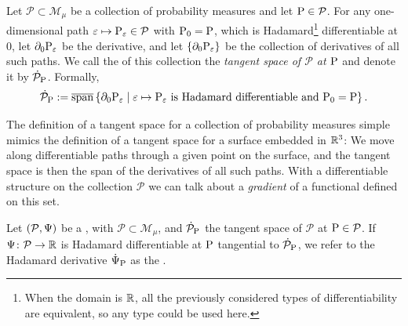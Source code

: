 \documentclass[a4,danish]{article}
\begin{document}
\begin{definition}
  Let $\mathcal{P} \subset \mathcal{M}_{\mu}$ be a collection of probability measures and let
  $\P \in \mathcal{P}$. For any one-dimensional path
  $\epsilon \mapsto \P_{\epsilon} \in \mathcal{P}$ with $\P_0 =\P$, which is Hadamard\footnote{When
    the domain is $\R$, all the previously considered types of differentiability are equivalent, so
    any type could be used here.} differentiable at 0, let $\partial_0\P_{\epsilon}$ be the
  derivative, and let $\{\partial_0\P_{\epsilon}\}$ be the collection of derivatives of all such paths. We call
  the  of this collection the \textit{tangent space of
    $\mathcal{P}$ at $\P$} and denote it by $\dot{\mathcal{P}}_{\P}$. Formally,
  \begin{equation*}
    \dot{\mathcal{P}}_{\P}
    := \overline{\mathrm{span}}
    \left\{ \partial_0\P_{\epsilon}
      \midd \epsilon \mapsto \P_{\epsilon} \text{ is Hadamard differentiable and } \P_0 = \P  \right\}.
  \end{equation*}
\end{definition}

The definition of a tangent space for a collection of probability measures simple mimics the
definition of a tangent space for a surface embedded in $\R^3$: We move along differentiable paths
through a given point on the surface, and the tangent space is then the span of the derivatives of
all such paths. With a differentiable structure on the collection $\mathcal{P}$ we can talk about a
\textit{gradient} of a functional defined on this set.

\begin{definition}
  Let $(\mathcal{P}, \TT)$ be a , with
  $\mathcal{P} \subset \mathcal{M}_{\mu}$, and
  $\dot{\mathcal{P}}_{\P}$ the tangent space of $\mathcal{P}$ at
  $\P \in \mathcal{P}$. If $\TT \colon \mathcal{P} \rightarrow \R$ is
  Hadamard differentiable at $\P$ tangential to
  $\dot{\mathcal{P}}_{\P}$, we refer to the Hadamard derivative
  $\dot{\TT}_{\P}$ as the .
\end{definition}
\end{document}
